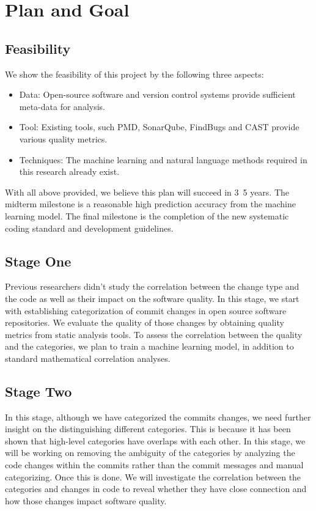 \section{Plan and Goal}
\label{sec:goal}

\subsection{Feasibility}
We show the feasibility of this project by the following three aspects:
\begin{itemize}
    \item Data: Open-source software and version control systems provide sufficient meta-data for analysis.
    \item Tool: Existing tools, such PMD, SonarQube, FindBugs and CAST provide various quality metrics.
    \item Techniques: The machine learning and natural language methods required in this research already exist.
\end{itemize}
With all above provided, we believe this plan will succeed in 3~5 years.
The midterm milestone is a reasonable high prediction accuracy from the machine learning model.
The final milestone is the completion of the new systematic coding standard and development guidelines.


\subsection{Stage One}
Previous researchers didn't study the correlation between the change type and the code as well as their impact on the software quality. 
In this stage, we start with establishing categorization of commit changes in open source software repositories.
We evaluate the quality of those changes by obtaining quality metrics from static analysis tools.
To assess the correlation between the quality and the categories, we plan to train a machine learning model, in addition to standard mathematical correlation analyses.

\subsection{Stage Two}
In this stage, although we have categorized the commits changes, we need further insight on the distinguishing different categories.
This is because it has been shown that high-level categories have overlaps with each other.
In this stage, we will be working on removing the ambiguity of the categories by analyzing the code changes within the commits rather than the commit messages and manual categorizing.
Once this is done. We will investigate the correlation between the categories and changes in code to reveal whether they have close connection and how those changes impact software quality.

